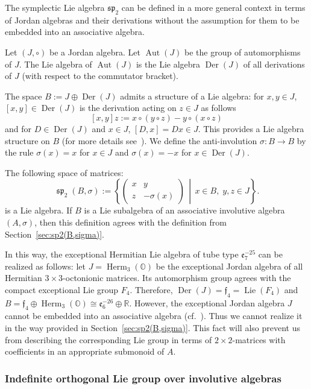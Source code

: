 \documentclass[a4paper,oneside,11pt]{amsart}
\DeclareMathOperator{\Aut}{Aut}
\DeclareMathOperator{\spp}{\mathfrak{sp}}
\DeclareMathOperator{\Lie}{Lie}
\DeclareMathOperator{\Herm}{Herm}
\DeclareMathOperator{\Der}{Der}
\newcommand{\midwd}{\,\middle\vert\,}
\newcommand{\R}{\mathbb R}
\theoremstyle{plain}
\theoremstyle{definition}
\theoremstyle{remark}
\begin{document}
The symplectic Lie algebra $\mathfrak{sp}_2$ can be defined in a more general context in terms of Jordan algebras and their derivations without the assumption for them to be embedded into an associative algebra.

Let $(J,\circ)$ be a Jordan algebra. Let $\Aut(J)$ be the group of automorphisms of $J$. The Lie algebra of  $\Aut(J)$ is the Lie algebra $\Der(J)$ of all derivations of $J$ (with respect to the commutator bracket).

The space $B:=J\oplus\Der(J)$ admits a structure of a Lie algebra: for $x,y\in J$, $[x,y]\in \Der(J)$ is the derivation acting on $z\in J$ as follows 
$$[x,y]z:=x\circ (y\circ z)-y\circ (x\circ z)$$
and for  $D\in \Der(J)$ and $x\in J$, $[D,x]=Dx\in J$. This provides a Lie algebra structure on $B$ (for more details see~\cite[Section~II.4]{Faraut}). We define the anti-involution $\sigma\colon B\to B$ by the rule $\sigma(x)=x$ for $x\in J$ and $\sigma(x)=-x$ for $x\in \Der(J)$.

The following space of matrices:
$$\spp_2(B,\sigma):=\left\{\begin{pmatrix}
x & y \\
z & -\sigma(x)
\end{pmatrix}\midwd x\in B,\;y,z\in J\right\}.$$
is a Lie algebra. If $B$ is a Lie subalgebra of an associative involutive algebra $(A,\sigma)$, then this definition agrees with the definition from Section~\ref{sec:sp2(B,sigma)}.

In this way, the exceptional Hermitian Lie algebra of tube type $\mathfrak e_7^{-25}$ can be realized as follows: let $J=\Herm_3(\mathbb O)$ be the exceptional Jordan algebra of all Hermitian $3\times 3$-octonionic matrices. Its automorphism group agrees with the compact exceptional Lie group $F_4$. Therefore, $\Der(J)=\mathfrak f_4=\Lie(F_4)$ and $B=\mathfrak f_4\oplus \Herm_3(\mathbb O)\cong \mathfrak e_6^{-26}\oplus\R$. However, the exceptional Jordan algebra $J$ cannot be embedded into an associative algebra (cf.~\cite[Corollary 2.8.5]{Hanche84}). Thus we cannot realize it in the way provided in Section~\ref{sec:sp2(B,sigma)}. This fact will also prevent us from describing the corresponding Lie group in terms of $2\times 2$-matrices with coefficients in an appropriate submonoid of $A$.


\subsubsection{Indefinite orthogonal Lie group over involutive algebras}\label{sec:indef.orth}
\end{document}
